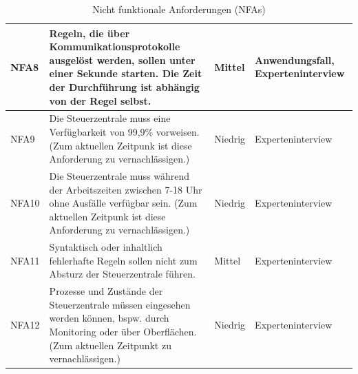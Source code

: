 \begin{table}[hbt!]
\begin{center}
\begin{tabular}{ | p{1.0cm} | p{9.2cm} | p{1.6cm} | p{3.1cm} | }
                \hline
                    NFA8 & Regeln, die über Kommunikationsprotokolle ausgelöst werden, sollen unter einer Sekunde starten. Die Zeit der Durchführung ist abhängig von der Regel selbst. & Mittel & Anwendungsfall, Experteninterview \\ 
                \hline
                    NFA9 & Die Steuerzentrale muss eine Verfügbarkeit von 99,9\% vorweisen. (Zum aktuellen Zeitpunk ist diese Anforderung zu vernachlässigen.) & Niedrig & Experteninterview \\ 
                \hline
                    NFA10 & Die Steuerzentrale muss während der Arbeitszeiten zwischen 7-18 Uhr ohne Ausfälle verfügbar sein. (Zum aktuellen Zeitpunk ist diese Anforderung zu vernachlässigen.) & Niedrig & Experteninterview \\ 
                \hline
                    NFA11 & Syntaktisch oder inhaltlich fehlerhafte Regeln sollen nicht zum Absturz der Steuerzentrale führen. & Mittel & Experteninterview \\ 
                \hline  
                    NFA12 & Prozesse und Zustände der Steuerzentrale müssen eingesehen werden können, bspw. durch Monitoring oder über Oberflächen. (Zum aktuellen Zeitpunkt zu vernachlässigen.) & Niedrig & Experteninterview \\
                \hline
            \end{tabular}
        \end{center}
        \caption{Nicht funktionale Anforderungen (NFAs)}
        \label{tab:notfunctionalRequirements}
    \end{table}

